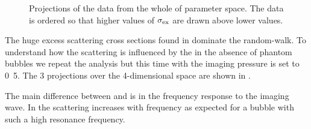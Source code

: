 


 \begin{figure}
  \begin{minipage}{\textwidth}
   \begin{center}
      \begin{narrow}{0cm}{-1cm}
        \subfloat[]{
     \label{fig:projection_short:dr_fr}
     } 
  \subfloat[]{
    \label{fig:projection_short:im_fr}
    }
  \end{narrow}
  \begin{narrow}{-1cm}{-1cm}
\subfloat[]{
     \label{fig:projection_short:dr_amp}
     }
    \caption{Projections of the data from the whole of parameter space.
      The data is ordered so that higher values of $\sigma_\textrm{ex}$ are drawn above lower values.
   }
   \label{fig:projections_short}
 \end{narrow}
 \end{center}
  \end{minipage}
 \end{figure}

The huge excess scattering cross sections found in 
dominate the random-walk.
To understand how the scattering is influenced by the in the absence of phantom bubbles we 
repeat the analysis but this time with the imaging pressure is set to \unit{0.5}\mega\pascal.
The 3 projections over the 4-dimensional space are shown in .

The main difference between  and  
is in the frequency response to the imaging wave.
In  the scattering increases with frequency 
as expected for a bubble with such a high resonance frequency.

